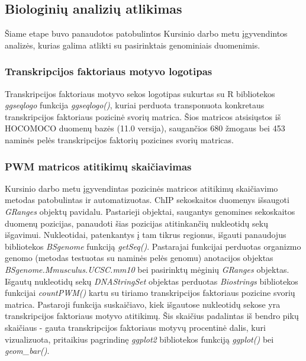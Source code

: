 \documentclass[12pt]{article}
\begin{document}
\newpage

\subsection{Biologinių analizių atlikimas}
Šiame etape buvo panaudotos patobulintos Kursinio darbo metu įgyvendintos
analizės, kurias galima atlikti su pasirinktais genominiais duomenimis.

\subsubsection*{Transkripcijos faktoriaus motyvo logotipas}
Transkripcijos faktoriaus motyvo sekos logotipas sukurtas su R bibliotekos
\emph{ggseqlogo}\cite{GGSEQLOGO} funkcija \emph{ggseqlogo()}, kuriai perduota
transponuota konkretaus transkripcijos faktoriaus pozicinė svorių matrica.
Šios matricos atsisiųstos iš HOCOMOCO\cite{HOCOMOCO} duomenų bazės (11.0
versija), saugančios 680 žmogaus bei 453 naminės pelės transkripcijos faktorių
pozicines svorių matricas.

\subsubsection*{PWM matricos atitikimų skaičiavimas}
Kursinio darbo metu įgyvendintas pozicinės matricos atitikimų skaičiavimo
metodas patobulintas ir automatizuotas. ChIP sekoskaitos duomenys išsaugoti
\emph{GRanges} objektų pavidalu. Pastarieji objektai, saugantys genomines
sekoskaitos duomenų pozicijas, panaudoti šias pozicijas atitinkančių nukleotidų
sekų išgavimui. Nukleotidai, patenkantys į tam tikrus regionus, išgauti
panaudojus bibliotekos \emph{BSgenome}\cite{BSGENOME} funkciją \emph{getSeq()}.
Pastarajai funkcijai perduotas organizmo genomo (metodas testuotas su naminės
pelės genomu) anotacijos objektas
\emph{BSgenome.Mmusculus.UCSC.mm10}\cite{BSMUSMUSCULUS} bei pasirinktų mėginių
\emph{GRanges} objektas. Išgautų nukleotidų sekų \emph{DNAStringSet} objektas
perduotas \emph{Biostrings}\cite{BIOSTRINGS} bibliotekos funkcijai
\emph{countPWM()} kartu su tiriamo transkripcijos faktoriaus pozicine svorių
matrica. Pastaroji funkcija suskaičiavo, kiek išgautose nukleotidų sekose yra
transkripcijos faktoriaus motyvo atitikimų. Šis skaičius padalintas iš bendro
pikų skaičiaus - gauta transkripcijos faktoriaus motyvų procentinė dalis,
kuri vizualizuota, pritaikius pagrindinę \emph{ggplot2} bibliotekos funkciją
\emph{ggplot()} bei \emph{geom\_bar()}.
\end{document}
